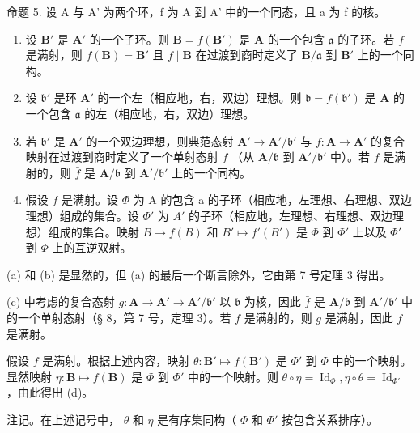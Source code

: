 命题 5. 设 A 与 A' 为两个环，f 为 A 到 A' 中的一个同态，且 a 为 f 的核。

\begin{enumerate}
\def\labelenumi{(\alph{enumi})}
\item
  设 \(\mathbf{B}'\) 是 \(\mathbf{A}'\) 的一个子环。则 \(\mathbf{B} = f(\mathbf{B}')\) 是 \(\mathbf{A}\) 的一个包含 \(\mathfrak{a}\) 的子环。若 \(f\) 是满射，则 \(f(\mathbf{B}) = \mathbf{B}'\) 且 \(f \mid \mathbf{B}\) 在过渡到商时定义了 \(\mathbf{B}/\mathfrak{a}\) 到 \(\mathbf{B}'\) 上的一个同构。
\item
  设 \(\mathfrak{b}'\) 是环 \(\mathbf{A}'\) 的一个左（相应地，右，双边）理想。则 \(\mathfrak{b} = f(\mathfrak{b}')\) 是 \(\mathbf{A}\) 的一个包含 \(\mathfrak{a}\) 的左（相应地，右，双边）理想。
\item
  若 \(\mathfrak{b}'\) 是 \(\mathbf{A}'\) 的一个双边理想，则典范态射 \(\mathbf{A}' \to \mathbf{A}' / \mathfrak{b}'\) 与 \(f: \mathbf{A} \to \mathbf{A}'\) 的复合映射在过渡到商时定义了一个单射态射 \(\bar{f}\) （从 \(\mathbf{A} / \mathfrak{b}\) 到 \(\mathbf{A}' / \mathfrak{b}'\) 中）。若 \(f\) 是满射的，则 \(\bar{f}\) 是 \(\mathbf{A} / \mathfrak{b}\) 到 \(\mathbf{A}' / \mathfrak{b}'\) 上的一个同构。
\item
  假设 \(f\) 是满射。设 \(\Phi\) 为 A 的包含 a 的子环（相应地，左理想、右理想、双边理想）组成的集合。设 \(\Phi'\) 为 \(A'\) 的子环（相应地，左理想、右理想、双边理想）组成的集合。映射 \(B \to f(B)\) 和 \(B' \mapsto f'(B')\) 是 \(\Phi\) 到 \(\Phi'\) 上以及 \(\Phi'\) 到 \(\Phi\) 上的互逆双射。
\end{enumerate}

(a) 和 (b) 是显然的，但 (a) 的最后一个断言除外，它由第 7 号定理 3 得出。

(c) 中考虑的复合态射 \(g: \mathbf{A} \to \mathbf{A}' \to \mathbf{A}' / \mathfrak{b}'\) 以 \(\mathfrak{b}\) 为核，因此 \(\bar{f}\) 是 \(\mathbf{A} / \mathfrak{b}\) 到 \(\mathbf{A}' / \mathfrak{b}'\) 中的一个单射态射（§ 8，第 7 号，定理 3）。若 \(f\) 是满射的，则 \(g\) 是满射，因此 \(\bar{f}\) 是满射。

假设 \(f\) 是满射。根据上述内容，映射 \(\theta: \mathbf{B}' \mapsto f(\mathbf{B}')\) 是 \(\Phi'\) 到 \(\Phi\) 中的一个映射。显然映射 \(\eta: \mathbf{B} \mapsto f(\mathbf{B})\) 是 \(\Phi\) 到 \(\Phi'\) 中的一个映射。则 \(\theta \circ \eta = \operatorname{Id}_{\Phi}, \eta \circ \theta = \operatorname{Id}_{\Phi'}\) ，由此得出 (d)。

注记。在上述记号中， \(\theta\) 和 \(\eta\) 是有序集同构（ \(\Phi\) 和 \(\Phi'\) 按包含关系排序）。

